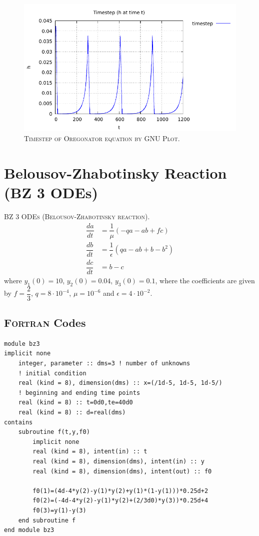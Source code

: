 \documentclass[a4paper,oneside]{book}
\numberwithin{equation}{chapter}
\begin{document}
\begin{figure}[H]
\centering
\includegraphics[scale=1.1]{o_ts}
\caption{\textsc{Timestep of Oregonator equation by GNU Plot.}}
\end{figure}
\section{Belousov-Zhabotinsky Reaction (BZ 3 ODEs)}
\textsc{BZ 3 ODEs (Belousov-Zhabotinsky reaction).}
\begin{align}
    \dfrac{da}{dt}  &=  \dfrac{1}{\mu} \left(-qa -ab + fc\right)
    \\
    \dfrac{db}{dt}  &=  \dfrac{1}{\epsilon} \left(qa -ab + b - b^2\right)
    \\
    \dfrac{dc}{dt}  &=  b-c
\end{align}
where $y_1\left(0\right) = 10$, $y_2\left(0\right) = 0.04$, $y_3\left(0\right) = 0.1$, where the coefficients are given by $f = \dfrac{2}{3}$, $q = 8\cdot 10^{-4}$, $\mu=10^{-6}$ and $\epsilon = 4\cdot 10^{-2}$.
\subsection{\textsc{Fortran} Codes}
\begin{lstlisting}
module bz3
implicit none 
	integer, parameter :: dms=3 ! number of unknowns
	! initial condition
	real (kind = 8), dimension(dms) :: x=(/1d-5, 1d-5, 1d-5/) 
	! beginning and ending time points
	real (kind = 8) :: t=0d0,te=40d0 
	real (kind = 8) :: d=real(dms)
contains      
	subroutine f(t,y,f0)
		implicit none
		real (kind = 8), intent(in) :: t
		real (kind = 8), dimension(dms), intent(in) :: y
		real (kind = 8), dimension(dms), intent(out) :: f0
		
		f0(1)=(4d-4*y(2)-y(1)*y(2)+y(1)*(1-y(1)))*0.25d+2
		f0(2)=(-4d-4*y(2)-y(1)*y(2)+(2/3d0)*y(3))*0.25d+4
		f0(3)=y(1)-y(3)
	end subroutine f
end module bz3
\end{lstlisting}
\end{document}
